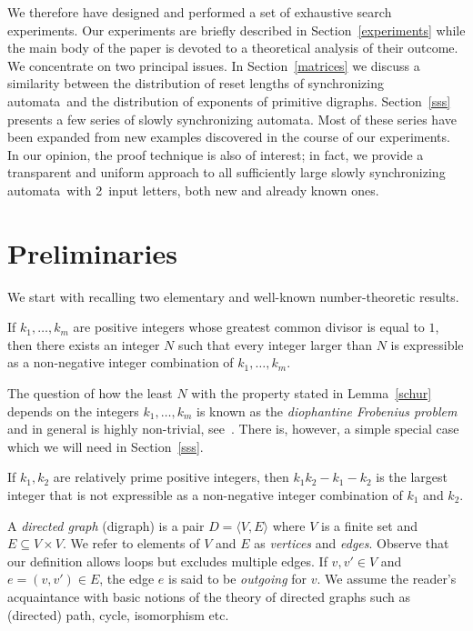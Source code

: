 \documentclass[11pt]{llncs}
\newcommand{\sa}{synchronizing automata}
\begin{document}
We therefore have designed and performed a set of exhaustive search
experiments. Our experiments are briefly described in Section~\ref{experiments}
while the main body of the paper is devoted to a theoretical analysis
of their outcome. We concentrate on two principal issues. In Section~\ref{matrices}
we discuss a similarity between the distribution of reset lengths of \sa\
and the distribution of exponents of primitive digraphs. Section~\ref{sss}
presents a few series of slowly \sa. Most of these series have been expanded
from new examples discovered in the course of our experiments. In our opinion,
the proof technique is also of interest; in fact, we provide a transparent
and uniform approach to all sufficiently large slowly \sa\ with 2~input letters,
both new and already known ones.

\section{Preliminaries}
\label{preliminaries}

We start with recalling two elementary and well-known number-theoretic results.
\begin{lemma}
\label{schur}
If $k_1,\dots,k_m$ are positive integers whose greatest common divisor is equal
to\/ $1$, then there exists an integer $N$ such that every integer larger than $N$
is expressible as a non-negative integer combination of $k_1,\dots,k_m$.
\end{lemma}
The question of how the least $N$ with the property stated in Lemma~\ref{schur}
depends on the integers $k_1,\dots,k_m$ is known as the \emph{diophantine Frobenius
problem} and in general is highly non-trivial, see~\cite{RaAl05}. There is, however,
a simple special case which we will need in Section~\ref{sss}.
\begin{lemma}
\label{sylvester}
If $k_1,k_2$ are relatively prime positive integers, then $k_1k_2-k_1-k_2$ is
the largest integer that is not expressible as a non-negative integer combination
of $k_1$ and $k_2$.
\end{lemma}

A \emph{directed graph} (digraph) is a pair $D=\langle V,E\rangle$ where $V$ is
a finite set and $E\subseteq V\times V$. We refer to elements of $V$ and $E$ as
\emph{vertices} and \emph{edges}. Observe that our definition allows loops but
excludes multiple edges. If $v,v'\in V$ and $e=(v,v')\in E$, the edge $e$ is said
to be \emph{outgoing} for $v$. We assume the reader's acquaintance with basic
notions of the theory of directed graphs such as (directed) path,
cycle, isomorphism etc.
\end{document}
